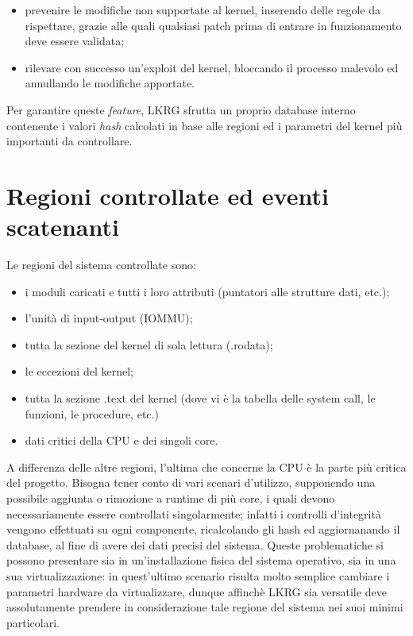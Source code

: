 \begin{itemize}
\item prevenire le modifiche non supportate al kernel, inserendo delle regole da rispettare, grazie alle quali qualsiasi patch prima di entrare in funzionamento deve essere validata;
\item rilevare con successo un'exploit del kernel, bloccando il processo malevolo ed annullando le modifiche apportate.
\end{itemize}

Per garantire queste \emph{feature}, LKRG sfrutta un proprio database interno contenente i valori \emph{hash} calcolati in base alle regioni ed i parametri del kernel più importanti da controllare.

\section{Regioni controllate ed eventi scatenanti}

Le regioni del sistema controllate sono:

\begin{itemize}
\item i moduli caricati e tutti i loro attributi (puntatori alle strutture dati, etc.);
\item l'unità di input-output (IOMMU);
\item tutta la sezione del kernel di sola lettura (.rodata);
\item le eccezioni del kernel;
\item tutta la sezione .text del kernel (dove vi è la tabella delle system call, le funzioni, le procedure, etc.)
\item dati critici della CPU e dei singoli core.
\end{itemize}

A differenza delle altre regioni, l'ultima che concerne la CPU è la parte più critica del progetto. Bisogna tener conto di vari scenari d'utilizzo, supponendo una possibile aggiunta o rimozione a runtime di più core, i quali devono necessariamente essere controllati singolarmente; infatti i controlli d'integrità vengono effettuati su ogni componente, ricalcolando gli hash ed aggiornanando il database, al fine di avere dei dati precisi del sistema. Queste problematiche si possono presentare sia in un'installazione fisica del sistema operativo, sia in una sua virtualizzazione: in quest'ultimo scenario risulta molto semplice cambiare i parametri hardware da virtualizzare, dunque affinchè LKRG sia versatile deve assolutamente prendere in considerazione tale regione del sistema nei suoi minimi particolari.

